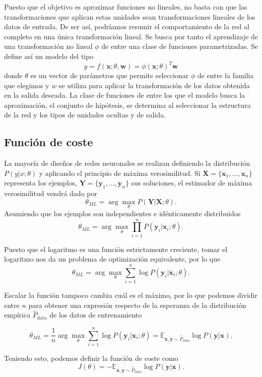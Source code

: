 Puesto que el objetivo es aproximar funciones no lineales, no basta con que las transformaciones que aplican estas unidades sean transformaciones lineales de los datos de entrada. De ser así, podríamos resumir el comportamiento de la red al completo en una única transformación lineal. Se busca por tanto el aprendizaje de una transformación no lineal $\phi$ de entre una clase de funciones parametrizadas. Se define así un modelo del tipo $$y = f(\textbf{x};\theta,\textbf{w}) = \phi(\textbf{x};\theta)^T\textbf{w}$$ donde $\theta$ es un vector de parámetros que permite seleccionar $\phi$ de entre la familia que elegimos y $w$ se utiliza para aplicar la transformación de los datos obtenida en la salida deseada. La clase de funciones de entre los que el modelo busca la aproximación, el conjunto de hipótesis, se determina al seleccionar la estructura de la red y los tipos de unidades ocultas y de salida.


\subsection{Función de coste}

La mayoría de diseños de redes neuronales se realizan definiendo la distribución $P(y|x;\theta)$ y aplicando el principio de máxima verosimilitud. Si $\textbf{X} = \{\textbf{x}_1,...,\textbf{x}_n\}$ representa los ejemplos, $\textbf{Y} = \{\textbf{y}_1,...,\textbf{y}_n\}$ sus soluciones, el estimador de máxima verosimilitud vendrá dado por $$\theta_{ML} = \arg \max_{\theta} P(\textbf{Y}|\textbf{X}; \theta).$$
Asumiendo que los ejemplos son independientes e idénticamente distribuidos
$$\theta_{ML} = \arg \max_{\theta} \prod_{i=1}^n P(\textbf{y}_i|\textbf{x}_i; \theta).$$

Puesto que el logaritmo es una función estrictamente creciente, tomar el logaritmo nos da un problema de optimización equivalente, por lo que $$\theta_{ML} = \arg \max_{\theta} \sum_{i=1}^n \log P(\textbf{y}_i|\textbf{x}_i; \theta).$$

Escalar la función tampoco cambia cuál es el máximo, por lo que podemos dividir entre $n$ para obtener una expresión respecto de la esperanza de la distribución empírica $\hat{P}_{\text{data}}$ de los datos de entrenamiento

$$\theta_{ML} = \frac{1}{n} \arg \max_{\theta} \sum_{i=1}^n \log P(\textbf{y}_i|\textbf{x}_i; \theta) = \mathbb{E}_{\textbf{x}, \textbf{y} \sim \hat{P}_{\text{data}}}\log P(\textbf{y}|\textbf{x}).$$

Teniendo esto, podemos definir la función de coste como
$$J(\theta) = -\mathbb{E}_{\textbf{x}, \textbf{y} \sim \hat{P}_{\text{data}}}\log P(\textbf{y}|\textbf{x}).$$

